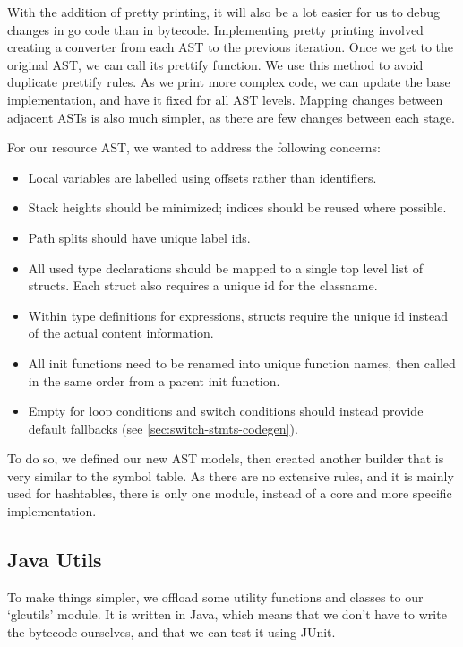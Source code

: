 \documentclass[11pt]{article}
\begin{document}
With the addition of pretty printing, it will also be a lot easier for us to debug changes in go code than in bytecode.
Implementing pretty printing involved creating a converter from each AST to the previous iteration.
Once we get to the original AST, we can call its prettify function.
We use this method to avoid duplicate prettify rules.
As we print more complex code, we can update the base implementation, and have it fixed for all AST levels.
Mapping changes between adjacent ASTs is also much simpler, as there are few changes between each stage.

For our resource AST, we wanted to address the following concerns:

\begin{itemize}
	\item Local variables are labelled using offsets rather than identifiers.
	\item Stack heights should be minimized; indices should be reused where possible.
	\item Path splits should have unique label ids.
	\item All used type declarations should be mapped to a single top level list of structs. Each struct also requires a unique id for the classname.
	\item Within type definitions for expressions, structs require the unique id instead of the actual content information.
	\item All init functions need to be renamed into unique function names, then called in the same order from a parent init function.
	\item Empty for loop conditions and switch conditions should instead provide default fallbacks (see \ref{sec:switch-stmts-codegen}).
\end{itemize}

To do so, we defined our new AST models, then created another builder that is very similar to the symbol table.
As there are no extensive rules, and it is mainly used for hashtables,
there is only one module, instead of a core and more specific implementation.

\subsection{Java Utils}

To make things simpler, we offload some utility functions and classes to our `glcutils' module.
It is written in Java, which means that we don't have to write the bytecode ourselves, and that we can test it using JUnit.
\end{document}
